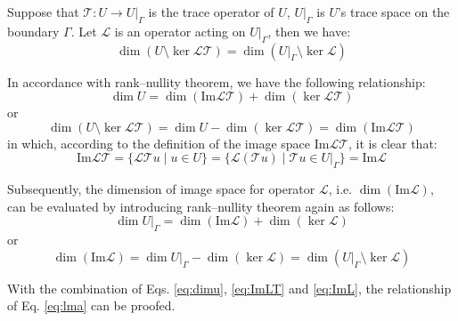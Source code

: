 \begin{lma}\label{lma:trace}
Suppose that $\mathcal T: U\rightarrow U\vert_\Gamma$ is the trace operator of $U$, $U\vert_\Gamma$ is $U$'s trace space on the boundary $\Gamma$. 
Let $\mathcal L$ is an operator acting on $U\vert_\Gamma$, then we have:
\begin{equation}\label{eq:lma}
    \dim (U\setminus \ker\mathcal L\mathcal T) = \dim (U\vert_\Gamma \setminus \ker \mathcal L)
\end{equation}
\end{lma}
\begin{pf}
In accordance with rank--nullity theorem, we have the following relationship:
\begin{equation}
    \dim U = \dim(\mathrm{Im} \mathcal L \mathcal T) + \dim(\ker \mathcal L \mathcal T)
\end{equation}
or
\begin{equation}\label{eq:dimu}
    \dim (U\setminus \ker \mathcal L\mathcal T) = 
    \dim U - \dim(\ker \mathcal L\mathcal T) = \dim(\mathrm{Im} \mathcal L \mathcal T)
\end{equation}
in which, according to the definition of the image space $\mathrm{Im} \mathcal L \mathcal T$, it is clear that:
\begin{equation}\label{eq:ImLT}
    \mathrm{Im}\mathcal L \mathcal T = \{
        \mathcal L \mathcal T u \; \vert \; u \in U
    \} = \{
        \mathcal L (\mathcal T u) \; \vert \; \mathcal T u \in U\vert_\Gamma
    \} = \mathrm{Im}\mathcal L
\end{equation}

Subsequently, the dimension of image space for operator $\mathcal L$, i.e. $\dim(\mathrm{Im} \mathcal L)$, can be evaluated by introducing rank--nullity theorem again as follows:
\begin{equation}
    \dim U\vert_\Gamma = \dim(\mathrm{Im} \mathcal L) + \dim(\ker \mathcal L)
\end{equation}
or
\begin{equation}\label{eq:ImL}
    \dim(\mathrm{Im}\mathcal L) = \dim U\vert_\Gamma - \dim(\ker \mathcal L) = \dim(U\vert_\Gamma\setminus\ker\mathcal L)
\end{equation}

With the combination of Eqs. \eqref{eq:dimu}, \eqref{eq:ImLT} and \eqref{eq:ImL}, the relationship of Eq. \eqref{eq:lma} can be proofed.
\end{pf}